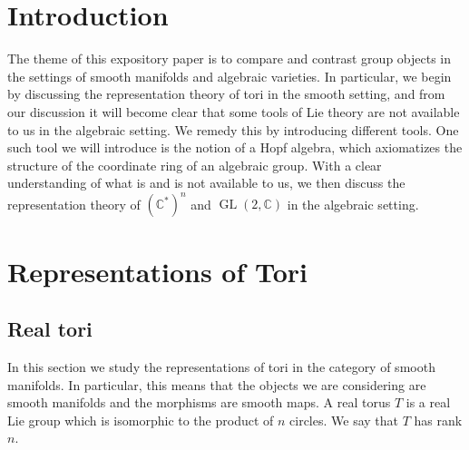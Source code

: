 \documentclass{amsart}
\DeclareMathOperator{\GL}{GL}
\newcommand{\C}{\mathbb{C}}
\numberwithin{equation}{section}
\theoremstyle{plain} %
\theoremstyle{definition}
\theoremstyle{remark}
\begin{document}




\section{Introduction}
The theme of this expository paper is to compare and contrast group objects in the settings of smooth manifolds and algebraic varieties.
In particular, we begin by discussing the representation theory of tori in the smooth setting, and from our discussion
it will become clear that some tools of Lie theory are not available to us in the algebraic setting. We remedy this
by introducing different tools. One such tool we will introduce is the notion
of a Hopf algebra, which axiomatizes the structure of the coordinate ring of an 
algebraic group. With a clear understanding of what is and is not available to us,
we then discuss the representation theory of $(\C^*)^n$ and $\GL(2,\C)$ in the algebraic setting.

\section{Representations of Tori}
\subsection{Real tori}
In this section we study the representations of tori in the category of smooth manifolds. In particular,
this means that the objects we are considering are smooth manifolds and the morphisms are smooth maps.
A real torus $T$ is a real Lie group which is isomorphic to the product of $n$ circles.
We say that $T$ has rank $n$.
\end{document}
